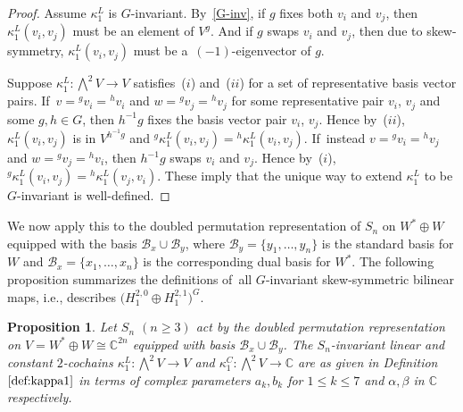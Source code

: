 \documentclass[pdftex]{sigma}
\numberwithin{equation}{section}
\newtheorem{Proposition}[Theorem]{Proposition}
 { \theoremstyle{definition}
\newtheorem{Definition}[Theorem]{Definition}
\newtheorem{Remark}[Theorem]{Remark}
\newtheorem{case}{Case}}
\newcommand{\actby}[1]{{}^{#1}}
\begin{document}
\begin{proof}
Assume $\kappa^L_1$ is $G$-invariant. By~\eqref{G-inv}, if $g$ fixes both $v_i$ and $v_j$, then $\kappa^L_1(v_i,v_j)$ must be an element of $V^g$. And if $g$ swaps $v_i$ and $v_j$, then due to skew-symmetry, $\kappa^L_1(v_i,v_j)$ must
be a~$(-1)$-eigenvector of $g$.

Suppose $\kappa^L_1\colon \bigwedge^2 V\to V$ satisfies~($i$) and~($ii$) for a set of representative basis vector pairs. If~$v=\actby{g}v_i=\actby{h}v_i$ and $w=\actby{g}v_j=\actby{h}v_j$ for some representative pair $v_i$, $v_j$ and some $g, h \in G$, then $h^{-1}g$ fixes the basis vector pair $v_i$, $v_j$. Hence by~($ii$),
$\kappa^L_1(v_i,v_j)$ is in $V^{h^{-1}g}$ and $\actby{g}\kappa^L_1(v_i,v_j)=\actby{h}\kappa^L_1(v_i,v_j)$. If~instead $v=\actby{g}v_i=\actby{h}v_j$ and $w=\actby{g}v_j=\actby{h}v_i$, then $h^{-1}g$ swaps $v_i$ and $v_j$. Hence by~($i$),
$\actby{g}\kappa^L_1(v_i,v_j)=\actby{h}\kappa^L_1(v_j,v_i)$.
These imply that the unique way to extend $\kappa^L_1$ to be $G$-invariant is well-defined.
\end{proof}

We now apply this to the doubled permutation representation of $S_n$
on $W^*\oplus W$ equipped with the basis
$\mathcal{B}_x \cup \mathcal{B}_y$,
where $\mathcal{B}_y=\{y_1,\dots,y_n\}$ is the standard basis for $W$ and
$\mathcal{B}_x=\{x_1,\dots,x_n\}$ is the corresponding dual basis for $W^*$.
The following proposition summarizes the definitions
of~all $G$-invariant skew-symmetric bilinear maps, i.e., describes $\big(H_1^{2,0}\oplus H_1^{2,1}\big)^G$.

\begin{Proposition}
\label{prop:kappa1}
Let $S_n$ $(n \geq 3)$ act by the doubled permutation representation on $V=W^* \oplus W \cong \mathbb{C}^{2n}$ equipped with basis $\mathcal{B}_x \cup \mathcal{B}_y$.
The $S_n$-invariant linear and constant $2$-cochains
$\kappa^L_1\colon \bigwedge^2 V \to V$ and
$\kappa^C_1\colon \bigwedge^2 V\to \mathbb{C}$ are as given in Definition~$\ref{def:kappa1}$ in
terms of complex parameters $a_k, b_k$ for $1 \leq k \leq 7$ and $\alpha, \beta$ in $\mathbb{C}$ respectively.
\end{Proposition}
\end{document}
